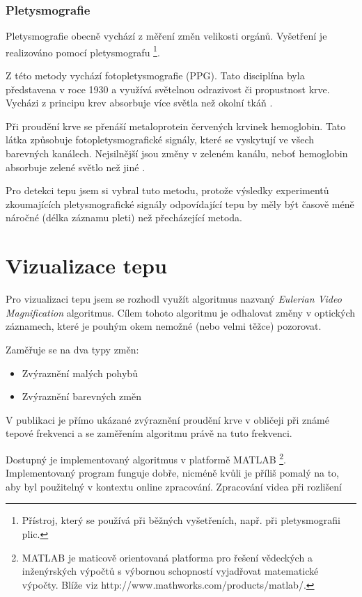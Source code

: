 \documentclass[
  digital, %
  table,   %
%
  lof,     %
  lot,     %
]{fithesis3}
\begin{document}
\subsubsection{Pletysmografie}
Pletysmografie obecně vychází z měření změn velikosti orgánů. Vyšetření je realizováno pomocí pletysmografu \footnote{Přístroj, který se používá při běžných vyšetřeních, např. při pletysmografii plic.}.

Z této metody vychází fotopletysmografie (PPG). Tato disciplína byla představena v roce 1930 a využívá světelnou odrazivost či propustnost krve. Vycházi z principu krev absorbuje více světla než okolní tkáň .

Při proudění krve se přenáší metaloprotein červených krvinek hemoglobin. Tato látka způsobuje fotopletysmografické signály, které se vyskytují ve všech barevných kanálech. Nejsilnější jsou změny v zeleném kanálu, neboť hemoglobin absorbuje zelené světlo než jiné .

Pro detekci tepu jsem si vybral tuto metodu, protože výsledky experimentů\cite{remote-plethysmographic} zkoumajících pletysmografické signály odpovídající tepu by měly být časově méně náročné (délka záznamu pleti) než přecházející metoda.

\section {Vizualizace tepu}
Pro vizualizaci tepu jsem se rozhodl využít algoritmus nazvaný \emph{Eulerian Video Magnification} algoritmus. Cílem tohoto algoritmu je odhalovat změny v optických záznamech, které je pouhým okem nemožné (nebo velmi těžce) pozorovat.

Zaměřuje se na dva typy změn:
\begin{itemize}
	\item Zvýraznění malých pohybů
    \item Zvýraznění barevných změn
\end{itemize}

V publikaci je přímo ukázané zvýraznění proudění krve v obličeji při známé tepové frekvenci a se zaměřením algoritmu právě na tuto frekvenci.

Dostupný je implementovaný algoritmus v platformě MATLAB
\footnote{MATLAB je maticově orientovaná platforma pro řešení vědeckých a inženýrských výpočtů s výbornou schopností vyjadřovat matematické výpočty. Blíže viz http://www.mathworks.com/products/matlab/.}.
Implementovaný program funguje dobře, nicméně kvůli je příliš pomalý na to, aby byl použitelný v kontextu online zpracování. Zpracování videa při rozlišení
\end{document}
